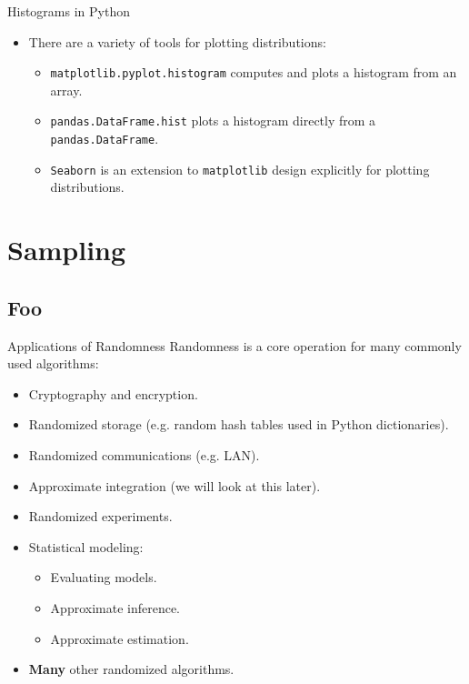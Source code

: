 \documentclass[serif,xcolor=pdftex,dvipsnames,table,hyperref={bookmarks=false,breaklinks}]{beamer}
\begin{document}
\begin{frame}[t,fragile]{Histograms in Python}
	\begin{itemize}[<+->]
		\item There are a variety of tools for plotting distributions:
		\begin{itemize}[<+->]
			\item \verb|matplotlib.pyplot.histogram| computes and plots a histogram from an array.
			\item \verb|pandas.DataFrame.hist| plots a histogram directly from a \verb|pandas.DataFrame|.
			\item \verb|Seaborn| is an extension to \verb|matplotlib| design explicitly for plotting distributions.
		\end{itemize}
	\end{itemize}
\end{frame}

\section{Sampling}
\subsection{Foo}

\begin{frame}[t]{Applications of Randomness}
	Randomness is a core operation for many commonly used algorithms:
	\pause
	\begin{itemize}[<+->]
		\item Cryptography and encryption.
		\item Randomized storage (e.g. random hash tables used in Python dictionaries).
		\item Randomized communications (e.g. LAN).
		\item Approximate integration (we will look at this later).
		\item Randomized experiments.
		\item Statistical modeling:
		\begin{itemize}[<+->]
			\item Evaluating models.
			\item Approximate inference.
			\item Approximate estimation.
		\end{itemize}
		\item \textbf{Many} other randomized algorithms.
	\end{itemize}
\end{frame}
\end{document}
